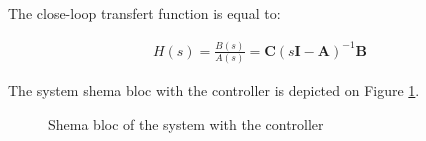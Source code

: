 % 
%    
%   
 
 
 
 The close-loop transfert function is equal to:
 
 \begin{multline} 
 H(s) = \frac{B(s)}{A(s)} = \bm{C}(s\bm{I}-\bm{A})^{-1}\bm{B}
 \end{multline}
  
 The system shema bloc with the controller is depicted on Figure \ref{bloc}.
 
\begin{figure}[hb]
\caption{Shema bloc of the system with the controller}
\label{bloc}
\end{figure}


